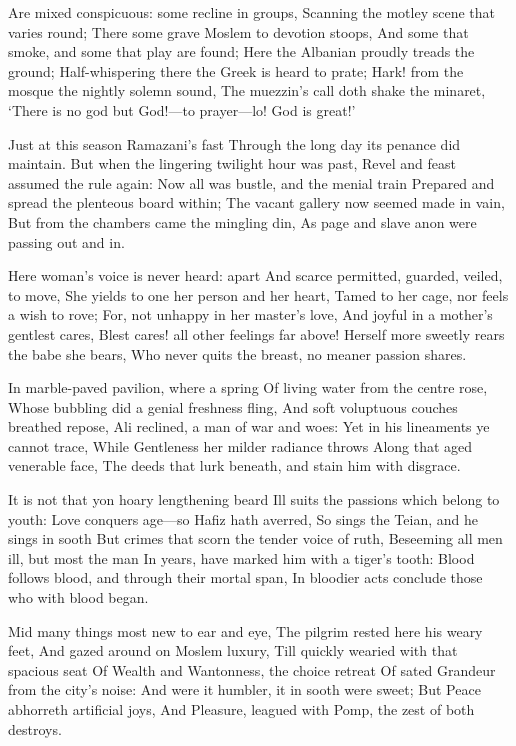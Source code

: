 \documentclass[10pt,twocolumn]{book}
\begin{document}
   Are mixed conspicuous:  some recline in groups,
   Scanning the motley scene that varies round;
   There some grave Moslem to devotion stoops,
   And some that smoke, and some that play are found;
   Here the Albanian proudly treads the ground;
   Half-whispering there the Greek is heard to prate;
   Hark! from the mosque the nightly solemn sound,
   The muezzin's call doth shake the minaret,
`There is no god but God!---to prayer---lo! God is great!'


   Just at this season Ramazani's fast
   Through the long day its penance did maintain.
   But when the lingering twilight hour was past,
   Revel and feast assumed the rule again:
   Now all was bustle, and the menial train
   Prepared and spread the plenteous board within;
   The vacant gallery now seemed made in vain,
   But from the chambers came the mingling din,
As page and slave anon were passing out and in.


   Here woman's voice is never heard:  apart
   And scarce permitted, guarded, veiled, to move,
   She yields to one her person and her heart,
   Tamed to her cage, nor feels a wish to rove;
   For, not unhappy in her master's love,
   And joyful in a mother's gentlest cares,
   Blest cares! all other feelings far above!
   Herself more sweetly rears the babe she bears,
Who never quits the breast, no meaner passion shares.


   In marble-paved pavilion, where a spring
   Of living water from the centre rose,
   Whose bubbling did a genial freshness fling,
   And soft voluptuous couches breathed repose,
   Ali reclined, a man of war and woes:
   Yet in his lineaments ye cannot trace,
   While Gentleness her milder radiance throws
   Along that aged venerable face,
The deeds that lurk beneath, and stain him with disgrace.


   It is not that yon hoary lengthening beard
   Ill suits the passions which belong to youth:
   Love conquers age---so Hafiz hath averred,
   So sings the Teian, and he sings in sooth\textemdash
   But crimes that scorn the tender voice of ruth,
   Beseeming all men ill, but most the man
   In years, have marked him with a tiger's tooth:
   Blood follows blood, and through their mortal span,
In bloodier acts conclude those who with blood began.


   Mid many things most new to ear and eye,
   The pilgrim rested here his weary feet,
   And gazed around on Moslem luxury,
   Till quickly wearied with that spacious seat
   Of Wealth and Wantonness, the choice retreat
   Of sated Grandeur from the city's noise:
   And were it humbler, it in sooth were sweet;
   But Peace abhorreth artificial joys,
And Pleasure, leagued with Pomp, the zest of both destroys.
\end{document}
